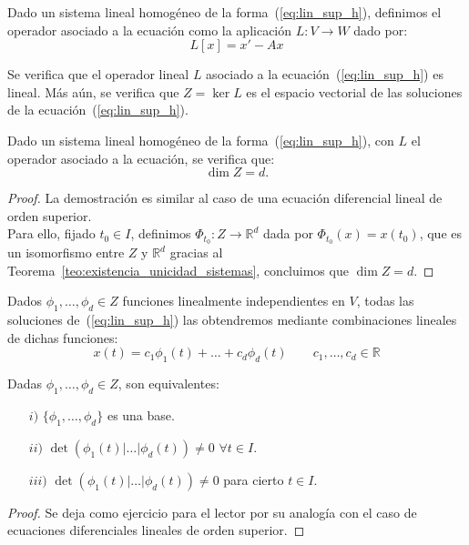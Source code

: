 \begin{definicion}
    Dado un sistema lineal homogéneo de la forma~(\ref{eq:lin_sup_h}), definimos el operador asociado a la ecuación como la aplicación $L:V\rightarrow W$ dado por:
    \begin{equation*}
        L[x] = x' - Ax
    \end{equation*}
\end{definicion}
Se verifica que el operador lineal $L$ asociado a la ecuación~(\ref{eq:lin_sup_h}) es lineal. Más aún, se verifica que $Z=\ker L$ es el espacio vectorial de las soluciones de la ecuación~(\ref{eq:lin_sup_h}). 

\begin{prop} Dado un sistema lineal homogéneo de la forma~(\ref{eq:lin_sup_h}), con $L$ el operador asociado a la ecuación, se verifica que:
    $$\dim Z = d.$$
    \begin{proof}
        La demostración es similar al caso de una ecuación diferencial lineal de orden superior.\\
        Para ello, fijado $t_0\in I$, definimos $\Phi_{t_0}:Z\rightarrow\mathbb{R}^d$ dada por $\Phi_{t_0}(x) = x(t_0)$, que es un isomorfismo entre $Z$ y $\mathbb{R}^d$ gracias al Teorema~\ref{teo:existencia_unicidad_sistemas}, concluimos que $\dim Z = d$.
    \end{proof}
\end{prop}

Dados $\phi_1,\ldots,\phi_d\in Z$ funciones linealmente independientes en $V$, todas las soluciones de~(\ref{eq:lin_sup_h}) las obtendremos mediante combinaciones lineales de dichas funciones:
\begin{equation*}
    x(t) = c_1\phi_1(t) + \ldots + c_d\phi_d(t) \qquad c_1,\ldots,c_d\in \mathbb{R}
\end{equation*}

\begin{prop}
    Dadas $\phi_1,\ldots,\phi_d\in Z$, son equivalentes:
    \begin{enumerate}
        \item[$i)$] $\{\phi_1,\ldots,\phi_d\}$ es una base.
        \item[$ii)$] $\det(\phi_1(t)|\ldots|\phi_d(t)) \neq 0$ $\forall t\in I$.
        \item[$iii)$] $\det(\phi_1(t)|\ldots|\phi_d(t)) \neq 0$ para cierto $t\in I$.
    \end{enumerate}
    \begin{proof}
        Se deja como ejercicio para el lector por su analogía con el caso de ecuaciones diferenciales lineales de orden superior.
    \end{proof}
\end{prop}~\\

